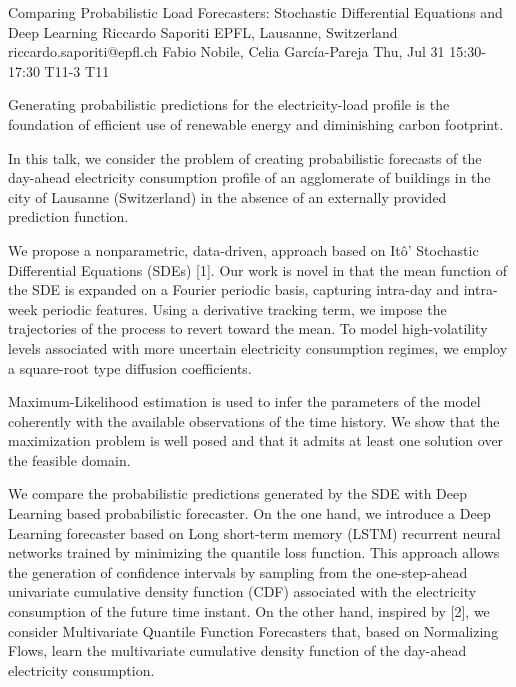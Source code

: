 \begin{talk}
  {Comparing Probabilistic Load Forecasters: Stochastic Differential Equations and Deep Learning}%
  {Riccardo Saporiti}%
  {EPFL, Lausanne, Switzerland}%
  {riccardo.saporiti@epfl.ch}%
  {Fabio Nobile, Celia García-Pareja}%
  {}%
  {Thu, Jul 31 15:30-17:30}%
  {T11-3}%
  {T11}%
  
				

Generating probabilistic predictions for the electricity-load profile is the foundation of efficient use of renewable energy and diminishing carbon footprint.

In this talk, we consider the problem of creating probabilistic forecasts of the day-ahead electricity consumption profile of an agglomerate of buildings in the city of Lausanne (Switzerland) in the absence of an externally provided prediction function. 
 
We propose a nonparametric, data-driven, approach based on Itô' Stochastic Differential Equations (SDEs) [1]. Our work is novel in that the mean function of the SDE is expanded on a Fourier periodic basis, capturing intra-day and intra-week periodic features. 
Using a derivative tracking term, we impose the trajectories of the process to revert toward the mean. To model high-volatility levels associated with more uncertain electricity consumption regimes, we employ a square-root type diffusion coefficients. 

Maximum-Likelihood estimation is used to infer the parameters of the model coherently with the available observations of the time history. We show that the maximization problem is well posed and that it admits at least one solution over the feasible domain. 

We compare the probabilistic predictions generated by the SDE with Deep Learning based probabilistic forecaster. 
On the one hand, we introduce a Deep Learning forecaster based on Long short-term memory (LSTM) recurrent neural networks trained by minimizing the quantile loss function. This approach allows the generation of confidence intervals by sampling from the one-step-ahead univariate cumulative density function (CDF) associated with the electricity consumption of the future time instant. 
On the other hand, inspired by [2], we consider Multivariate Quantile Function Forecasters that, based on Normalizing Flows, learn the multivariate cumulative density function of the day-ahead electricity consumption.


\end{talk}
